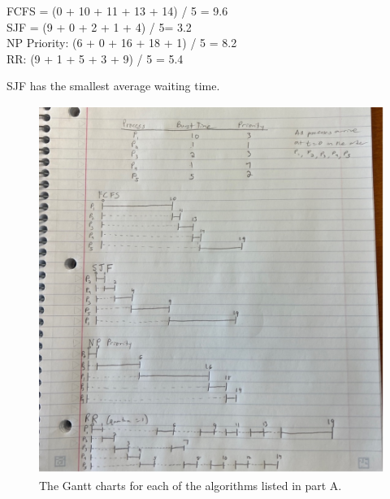 \documentclass[letterpaper, 10pt,DIV=13]{scrartcl}
\numberwithin{equation}{section} %
\numberwithin{figure}{section} %
\numberwithin{table}{section} %
\begin{document}
FCFS = (0 + 10 + 11 + 13 + 14) / 5 = 9.6 \\
SJF = (9 + 0 + 2 + 1 + 4) / 5= 3.2 \\
NP Priority: (6 + 0 + 16 + 18 + 1) / 5 = 8.2 \\
RR: (9 + 1 + 5 + 3 + 9) / 5 = 5.4

SJF has the smallest average waiting time.


\begin{figure}[ht] 
   \includegraphics[height=12cm]{ganttCharts.jpg}
   \caption{The Gantt charts for each of the algorithms listed in part A.}
   \label{fig:ganttCharts}
\end{figure}
\end{document}
